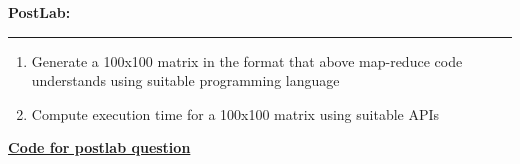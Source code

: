 \documentclass[11pt,article]{memoir}
\begin{document}
\begin{flushleft}
\begin{lstlisting}[language=java]
\end{lstlisting}
\newpage
\textbf{PostLab:}\hrule
\begin{enumerate}
\item Generate a 100x100 matrix in the format that above map-reduce code understands using suitable programming language
\item Compute execution time for a 100x100 matrix using suitable APIs
\end{enumerate}
\textbf{\underline{Code for postlab question}}                        
                          
\newpage

\end{flushleft}
\end{document}

